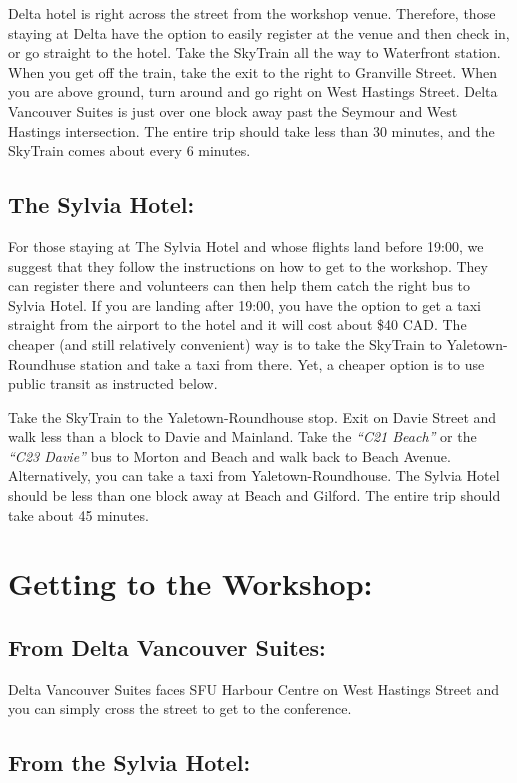 \documentclass[letterpaper,12pt]{article}
\newcommand{\bus}[1]{\textit{``#1''}}
\begin{document}
Delta hotel is right across the street from the workshop venue. Therefore, those staying at Delta have the option to easily register at the venue and then check in, or go straight to the hotel.
Take the SkyTrain all the way to Waterfront station. When you get off the train, take the exit to the right to Granville Street. When you are above ground, turn around and go right on West Hastings Street. Delta Vancouver Suites is just over one block away past the Seymour and West Hastings intersection. The entire trip should take less than 30 minutes, and the SkyTrain comes about every 6 minutes.

\subsection*{The Sylvia Hotel:}

For those staying at The Sylvia Hotel and whose flights land before 19:00, we suggest that they follow the instructions on how to get to the workshop. They can register there and volunteers can then help them catch the right bus to Sylvia Hotel.
If you are landing after 19:00, you have the option to get a taxi straight from the airport to the hotel and it will cost about \$40 CAD. The cheaper (and still relatively convenient) way is to take the SkyTrain to Yaletown-Roundhuse station and take a taxi from there. Yet, a cheaper option is to use public transit as instructed below.

Take the SkyTrain to the Yaletown-Roundhouse stop. Exit on Davie Street and walk less than a block to Davie and Mainland. Take the \bus{C21 Beach} or the \bus{C23 Davie} bus to Morton and Beach and walk back to Beach Avenue. Alternatively, you can take a taxi from Yaletown-Roundhouse. The Sylvia Hotel should be less than one block away at Beach and Gilford. The entire trip should take about 45 minutes.


\section*{Getting to the Workshop:}

\subsection*{From Delta Vancouver Suites:}

Delta Vancouver Suites faces SFU Harbour Centre on West Hastings Street and you can simply cross the street to get to the conference.

\subsection*{From the Sylvia Hotel:}
\end{document}
